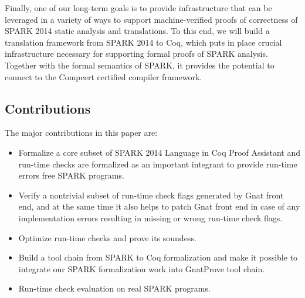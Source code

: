 Finally, one of our long-term goals is to provide infrastructure that can be 
leveraged in a variety of ways to support machine-verified proofs of 
correctness of SPARK 2014 static analysis and 
translations. To this end, we will build a translation framework 
from SPARK 2014 to Coq, which puts in place crucial infrastructure 
necessary for supporting formal proofs of SPARK analysis. Together 
with the formal semantics of SPARK, it provides the potential to 
connect to the Compcert \cite{Leroy:09} certified compiler framework.

\subsection{Contributions}
The major contributions in this paper are:
\begin{itemize}
\item Formalize a core subset of SPARK 2014 Language in Coq Proof Assistant and
run-time checks are formalized as an important integrant to provide run-time
errors free SPARK programs.
\item Verify a nontrivial subset of run-time check flags generated by Gnat
front end, and at the same time it also helps to patch Gnat front end in case of
any implementation errors resulting in missing or wrong run-time check flags.
\item Optimize run-time checks and prove its soundess.  
\item Build a tool chain from SPARK to Coq formalization and make it possible to
integrate our SPARK formalization work into GnatProve tool chain.
\item Run-time check evaluation on real SPARK programs.
\end{itemize}  